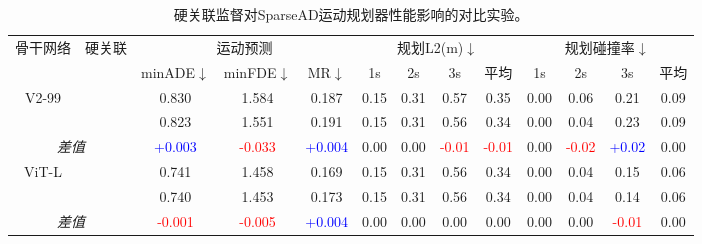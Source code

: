 	\begin{table}[t]
		\caption{硬关联监督对SparseAD运动规划器性能影响的对比实验。}
		\begin{center}
			\tiny
			\vspace{-10pt}
			{
				\begin{tabular}{c|c|ccc|cccc|cccc}
					\toprule
					\multirow{2}{*}{骨干网络}& \multirow{2}{*}{硬关联}& \multicolumn{3}{c|}{运动预测} & \multicolumn{4}{c|}{规划L2(m)$\downarrow$} & \multicolumn{4}{c}{规划碰撞率$\downarrow$}\\
					&&minADE$\downarrow$&	minFDE$\downarrow$&	MR$\downarrow$&1s &2s&3s&平均&1s &2s&3s&平均\\
					\midrule
					\multirow{2}{*}{V2-99\cite{lee2020centermask}}& \Checkmark& 0.830&	1.584&	0.187& 0.15&0.31&0.57&0.35 &	0.00&0.06&0.21&0.09\\
					&\XSolidBrush & 0.823&	1.551&	0.191&	0.15&0.31&0.56&0.34&	0.00&0.04&0.23& 0.09\\
					\midrule
					\multicolumn{2}{|c|}{\textit{差值}}& \textcolor{blue}{+0.003} &\textcolor{red}{-0.033}& \textcolor{blue}{+0.004}& 0.00& 0.00& \textcolor{red}{-0.01}& \textcolor{red}{-0.01}& 0.00 &\textcolor{red}{-0.02}& \textcolor{blue}{+0.02}& 0.00\\
					\midrule
					\multirow{2}{*}{ViT-L\cite{dosovitskiy2020image}}& \Checkmark&0.741&	1.458&	0.169& {0.15}&{0.31}&{0.56}&{0.34}&	{0.00}&{0.04}&{0.15}&{0.06}\\
					&\XSolidBrush& 0.740&	1.453&	0.173&	0.15&0.31&0.56&0.34&	0.00&0.04&0.14& 0.06\\
					\midrule
					\multicolumn{2}{|c|}{\textit{差值}} & \textcolor{red}{-0.001}& \textcolor{red}{-0.005}& \textcolor{blue}{+0.004}& 0.00& 0.00 &0.00& 0.00& 0.00& 0.00& \textcolor{red}{-0.01} &0.00\\
					\bottomrule
				\end{tabular}%
			}
		\end{center}
		\label{tab:hard-asso-motion-planner}
	\end{table}